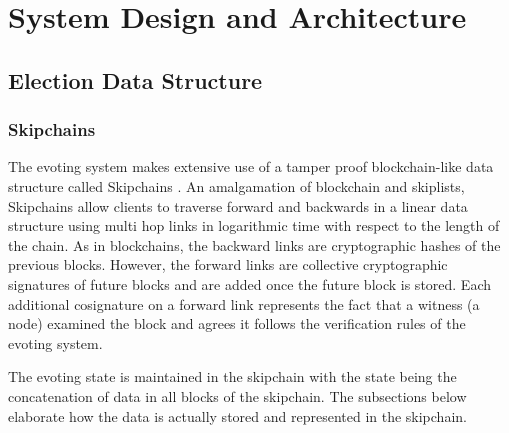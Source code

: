 
\chapter{System Design and Architecture} %

\label{Chapter2} %



\section{Election Data Structure}

\subsection{Skipchains}

The evoting system makes extensive use of a tamper proof blockchain-like data structure called Skipchains \cite{skipchains}. An amalgamation of blockchain and skiplists, Skipchains allow clients to traverse forward and backwards in a linear data structure using multi hop links in logarithmic time with respect to the length of the chain. As in blockchains, the backward links are cryptographic hashes of the previous blocks. However, the forward links are collective cryptographic signatures of future blocks and are added once the future block is stored. Each additional cosignature on a forward link represents the fact that a witness (a node) examined the block and agrees it follows the verification rules of the evoting system.

The evoting state is maintained in the skipchain with the state being the concatenation of data in all blocks of the skipchain. The subsections below elaborate how the data is actually stored and represented in the skipchain.

